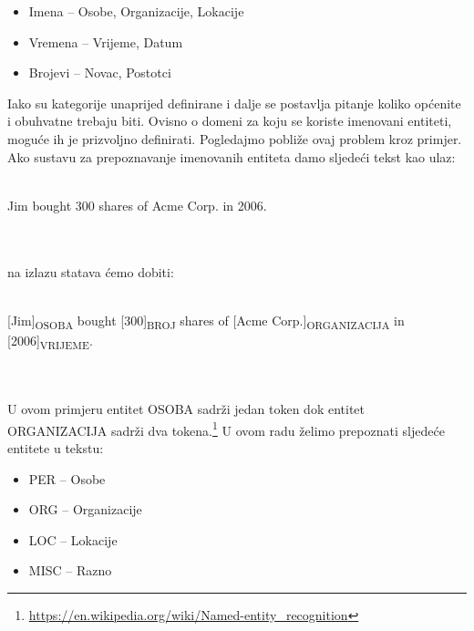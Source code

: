 \documentclass[times, utf8, seminar]{fer}
\begin{document}
\begin{itemize}
	\item Imena -- Osobe, Organizacije, Lokacije
	\item Vremena -- Vrijeme, Datum
	\item Brojevi -- Novac, Postotci
\end{itemize}

Iako su kategorije unaprijed definirane i dalje se postavlja pitanje koliko općenite i obuhvatne trebaju biti. Ovisno o domeni za koju se koriste imenovani entiteti, moguće ih je prizvoljno definirati. Pogledajmo pobliže ovaj problem kroz primjer. Ako sustavu za prepoznavanje imenovanih entiteta damo sljedeći tekst kao ulaz: \\\\
\centerline{Jim  bought 300 shares of Acme Corp. in 2006.}\\\\
na izlazu statava ćemo dobiti:\\\\
\centerline{[Jim]\textsubscript{OSOBA} bought [300]\textsubscript{BROJ} shares of [Acme Corp.]\textsubscript{ORGANIZACIJA} in [2006]\textsubscript{VRIJEME}.}\\\\
U ovom primjeru entitet OSOBA sadrži jedan token dok entitet ORGANIZACIJA sadrži dva tokena.\footnote{\url{https://en.wikipedia.org/wiki/Named-entity_recognition}} U ovom radu želimo prepoznati sljedeće entitete u tekstu:

\begin{itemize}
	\item PER -- Osobe
	\item ORG -- Organizacije
	\item LOC -- Lokacije
	\item MISC -- Razno
\end{itemize}
\end{document}
